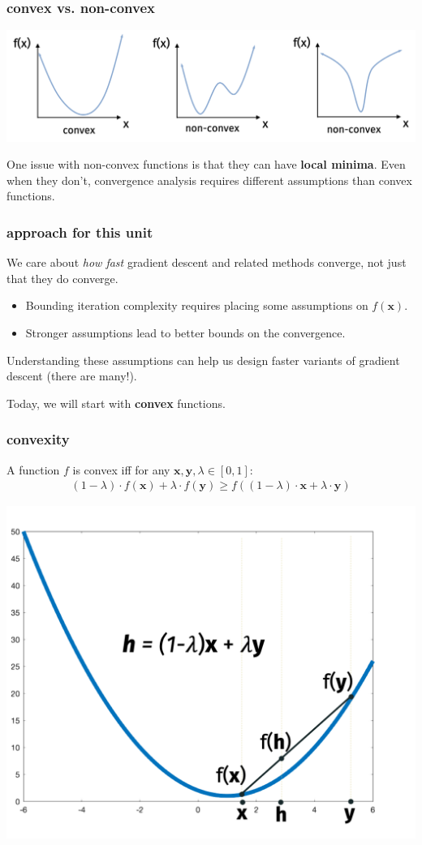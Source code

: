 \documentclass[compress]{beamer}
\newcommand{\bv}[1]{\mathbf{#1}}
\begin{document}
\begin{frame}[t]
	\frametitle{convex vs. non-convex}
	\begin{center}
		\includegraphics[width=\textwidth]{nonconvex_converge.png}
	\end{center}
	One issue with non-convex functions is that they can have \alert{\textbf{local minima}}. Even when they don't, convergence analysis requires different assumptions than convex functions. 	
\end{frame}

\begin{frame}[t]
	\frametitle{approach for this unit}
	We care about \emph{how fast} gradient descent and related methods converge, not just that they do converge. 
	\begin{itemize}
		\item Bounding iteration complexity requires placing some assumptions on $f(\bv{x})$. 
		\item Stronger assumptions lead to better bounds on the convergence. 
	\end{itemize}
	Understanding these assumptions can help us design faster variants of gradient descent (there are many!). 
	
	\begin{center}
		Today, we will start with \textbf{convex} functions. 
	\end{center}
\end{frame}

\begin{frame}[t]
	\frametitle{convexity}
	\begin{definition}[Convex]
		A function $f$ is convex iff for any $\bv{x}, \bv{y},\lambda \in [0,1]$:
		\begin{align*}
		(1-\lambda)\cdot f(\bv{x}) + \lambda \cdot f(\bv{y}) \geq f\left((1-\lambda)\cdot\bv{x} + \lambda \cdot\bv{y}\right)
		\end{align*}
	\end{definition}
\vspace{-.5em}
\begin{center}
	\includegraphics[width=.6\textwidth]{convex1.png}
\end{center}
\end{frame}
\end{document}
